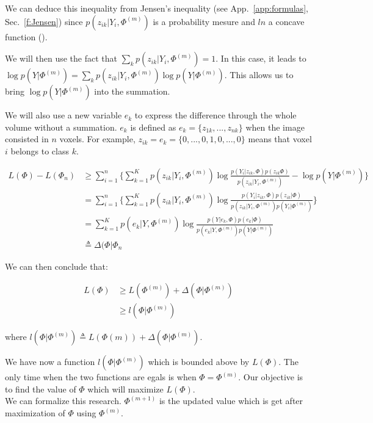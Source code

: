 We can deduce this inequality from Jensen's inequality (see App.~\ref{app:formulas}, Sec.~\ref{f:Jensen}) since  $p(z_{ik}|Y_i,\Phi^{(m)})$ is a probability mesure and $ln$ a concave function (\cite{5}). %

\par
We will then use the fact that  $\sum_k p(z_{ik}|Y_i,\Phi^{(m)})=1$. In this case, it leads to $\operatorname*{log} p(Y|\Phi^{(m)})=\sum_k p(z_{ik}|Y_i,\Phi^{(m)})\operatorname*{log} p(Y|\Phi^{(m)})$. This allows us to bring $\operatorname*{log} p(Y|\Phi^{(m)})$ into the summation. 
\par
We will also use a new variable $e_k$ to express the difference through the whole volume without a summation. $e_k$ is defined as $e_k=\{z_{1k}, ..., z_{nk}\}$ when the image consisted in $n$ voxels. For example, $z_{ik}=e_k=\{0,...,0,1,0,...,0\}$ means that voxel $i$ belongs to class $k$.

  \begin{align*}
  L(\Phi)-L(\Phi_n) &\geq \sum_{i=1}^n\{\sum_{k=1}^K p(z_{ik}|Y_i,\Phi^{(m)})\operatorname*{log} \frac{p(Y_i|z_{ik},\Phi)p(z_{ik}\Phi)}{p(z_{ik}|Y_i,\Phi^{(m)})}-\operatorname*{log} p(Y|\Phi^{(m)})\} \\
                    &=\sum_{i=1}^n\{\sum_{k=1}^K   p(z_{ik}|Y_i,\Phi^{(m)})\operatorname*{log} \frac{p(Y_i|z_{ik},\Phi)p(z_{ik}|\Phi)}{p(z_{ik}|Y_i,\Phi^{(m)})p(Y_i|\Phi^{(m)})}\}\\
                    &=\sum_{k=1}^K   p(e_{k}|Y,\Phi^{(m)})\operatorname*{log} \frac{p(Y|e_{k},\Phi)p(e_{k}|\Phi)}{p(e_{k}|Y,\Phi^{(m)})p(Y|\Phi^{(m)})}\\
                    &\triangleq \Delta(\Phi|\Phi_n
  \end{align*}

We can then conclude that:

  \begin{align*}
  L(\Phi) &\geq L(\Phi^{(m)}) + \Delta(\Phi|\Phi^{(m)})\\
          &\geq l(\Phi|\Phi^{(m)})
  \end{align*}

where $l(\Phi|\Phi^{(m)}) \triangleq  L(\Phi{(m)}) + \Delta(\Phi|\Phi^{(m)})$.\\
\par
We have now a function $l(\Phi|\Phi^{(m)})$ which is bounded above by $L(\Phi)$. The only time when the two functions are egals is when $\Phi=\Phi^{(m)}$.
Our objective is to find the value of $\Phi$ which will maximize $L(\Phi)$. \\
We can formalize this research. $\Phi^{(m+1)}$ is the updated value which is get after maximization of $\Phi$ using $\Phi^{(m)}$. %

